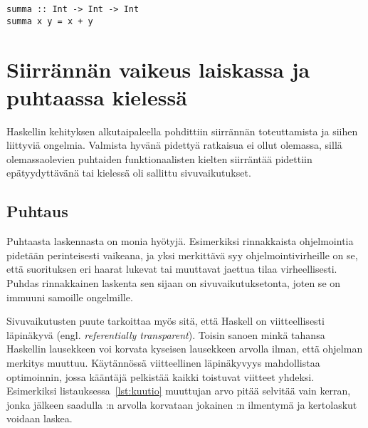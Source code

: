 \documentclass[finnish]{tktltiki2}
\begin{document}
\begin{lstlisting}[float,label={lst:esittely},caption={Syntaksin esittely}]
summa :: Int -> Int -> Int
summa x y = x + y
\end{lstlisting}

\section{Siirrännän vaikeus laiskassa ja puhtaassa kielessä}



Haskellin kehityksen alkutaipaleella pohdittiin siirrännän toteuttamista ja siihen liittyviä
ongelmia. Valmista hyvänä pidettyä ratkaisua ei ollut olemassa, sillä olemassaolevien puhtaiden
funktionaalisten kielten siirräntää pidettiin epätyydyttävänä tai kielessä oli sallittu
sivuvaikutukset.

\subsection{Puhtaus}

Puhtaasta laskennasta on monia hyötyjä.  Esimerkiksi rinnakkaista
ohjelmointia pidetään perinteisesti vaikeana, ja yksi merkittävä syy ohjelmointivirheille on se,
että suorituksen eri haarat lukevat tai muuttavat jaettua tilaa virheellisesti. Puhdas rinnakkainen
laskenta sen sijaan on sivuvaikutuksetonta, joten se on immuuni samoille ongelmille.


Sivuvaikutusten puute tarkoittaa myös sitä, että Haskell on viitteellisesti läpinäkyvä (engl.
\emph{referentially transparent}). Toisin sanoen minkä tahansa Haskellin lausekkeen voi korvata
kyseisen lausekkeen arvolla ilman, että ohjelman merkitys muuttuu. Käytännössä viitteellinen
läpinäkyvyys mahdollistaa optimoinnin, jossa kääntäjä pelkistää kaikki toistuvat viitteet yhdeksi.
Esimerkiksi listauksessa~\ref{lst:kuutio} muuttujan  arvo pitää selvitää vain kerran, jonka
jälkeen saadulla :n arvolla korvataan jokainen :n ilmentymä ja kertolaskut voidaan
laskea.
\end{document}

